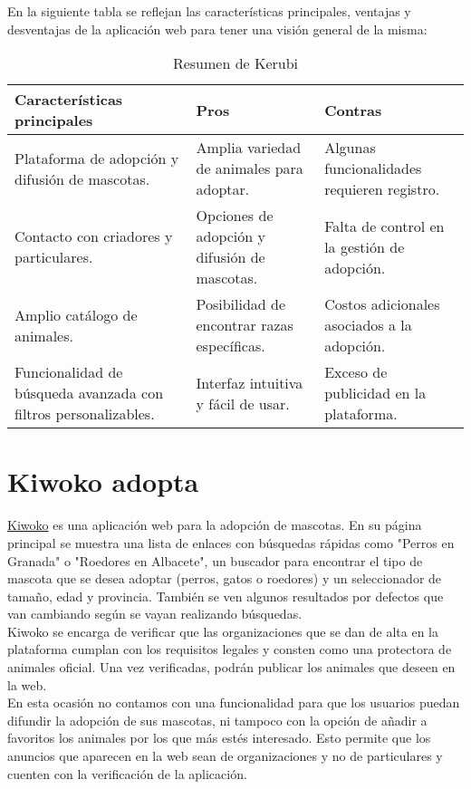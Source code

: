 En la siguiente tabla se reflejan las características principales, ventajas y desventajas de la aplicación web
para tener una visión general de la misma: \\

\begin{table}[h]
\centering
\begin{tabular}{|p{6cm}|p{4cm}|p{4cm}|}
\hline
\textbf{Características principales} & \textbf{Pros} & \textbf{Contras} \\
\hline
Plataforma de adopción y difusión de mascotas. &
Amplia variedad de animales para adoptar. &
Algunas funcionalidades requieren registro. \\
\hline
Contacto con criadores y particulares. &
Opciones de adopción y difusión de mascotas. &
Falta de control en la gestión de adopción. \\
\hline
Amplio catálogo de animales. &
Posibilidad de encontrar razas específicas. &
Costos adicionales asociados a la adopción. \\
\hline
Funcionalidad de búsqueda avanzada con filtros personalizables. &
Interfaz intuitiva y fácil de usar. &
Exceso de publicidad en la plataforma. \\
\hline
\end{tabular}
\caption{Resumen de Kerubi}
\label{tab:kerubi}
\end{table}

\section{Kiwoko adopta}\label{sec:kiwoko}

\href{https://kiwokoadopta.org}{Kiwoko} es una aplicación web para la adopción de mascotas. En su página principal se muestra
una lista de enlaces con búsquedas rápidas como "Perros en Granada" o "Roedores en Albacete", un buscador para encontrar
el tipo de mascota que se desea adoptar (perros, gatos o roedores) y un seleccionador de tamaño, edad y provincia.
También se ven algunos resultados por defectos que van cambiando según se vayan realizando búsquedas. \\

Kiwoko se encarga de verificar que las organizaciones que se dan de alta en la plataforma cumplan con los requisitos
legales y consten como una protectora de animales oficial. Una vez verificadas, podrán publicar los animales que
deseen en la web. \\

En esta ocasión no contamos con una funcionalidad para que los usuarios puedan difundir la adopción de sus mascotas,
ni tampoco con la opción de añadir a favoritos los animales por los que más estés interesado. Esto permite
que los anuncios que aparecen en la web sean de organizaciones y no de particulares y cuenten con la verificación
de la aplicación. \\

